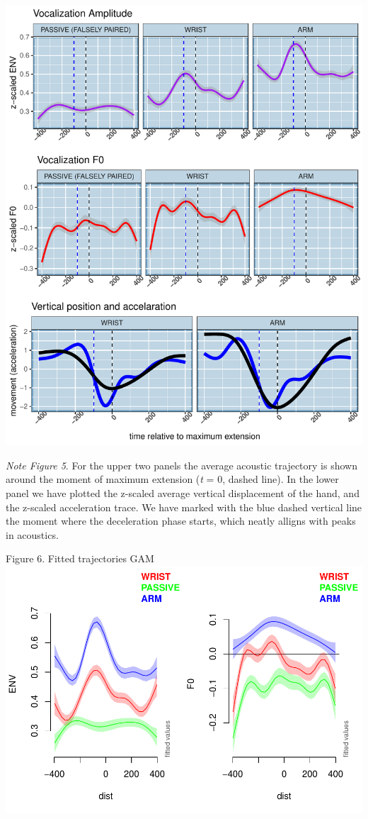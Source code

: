 \documentclass[
  man,floatsintext]{apa6}
\begin{document}
\includegraphics{GS_physics_in_fluid_speech_files/figure-latex/movementplot_avF0_avENV-1.pdf}

\emph{Note Figure 5}. For the upper two panels the average acoustic trajectory is shown around the moment of maximum extension (\emph{t} = 0, dashed line). In the lower panel we have plotted the z-scaled average vertical displacement of the hand, and the z-scaled acceleration trace. We have marked with the blue dashed vertical line the moment where the deceleration phase starts, which neatly alligns with peaks in acoustics.

Figure 6. Fitted trajectories GAM
\includegraphics{GS_physics_in_fluid_speech_files/figure-latex/table_anddiff-1.pdf}
\end{document}

